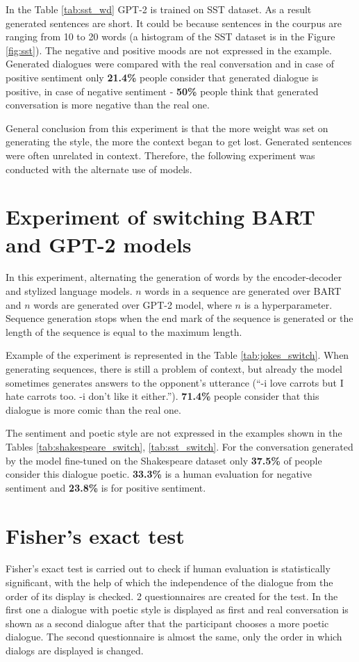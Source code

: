 In the Table \ref{tab:sst_wd} GPT-2 is trained on SST dataset. As a result generated sentences are short. It could be because sentences in the courpus are ranging from 10 to 20 words (a histogram of the SST dataset is in the Figure \ref{fig:sst}). The negative and positive moods are not expressed in the example. Generated dialogues were compared with the real conversation and in case of positive sentiment only \textbf{21.4\%} people consider that generated dialogue is positive, in case of negative sentiment - \textbf{50\%} people think that generated conversation is more negative than the real one. 

General conclusion from this experiment is that the more weight was set on generating the style, the more the context began to get lost. Generated sentences were often unrelated in context. Therefore, the following experiment was conducted with the alternate use of models.

\section{Experiment of switching BART and GPT-2 models}
In this experiment, alternating the generation of words by the encoder-decoder and stylized language models. $n$ words in a sequence are generated over BART and $n$ words are generated over GPT-2 model, where $n$ is a hyperparameter. Sequence generation stops when the end mark of the sequence is generated or the length of the sequence is equal to the maximum length.

Example of the experiment is represented in the Table \ref{tab:jokes_switch}. When generating sequences, there is still a problem of context, but already the model sometimes generates answers to the opponent's utterance (``-i love carrots but I hate carrots too. -i don't like it either.''). \textbf{71.4\%} people consider that this dialogue is more comic than the real one.

The sentiment and poetic style are not expressed in the examples shown in the Tables \ref{tab:shakespeare_switch}, \ref{tab:sst_switch}. For the conversation generated by the model fine-tuned on the Shakespeare dataset only \textbf{37.5\%} of people consider this dialogue poetic. \textbf{33.3\%} is a human evaluation for negative sentiment and \textbf{23.8\%} is for positive sentiment.

\section{Fisher's exact test}
Fisher's exact test is carried out to check if human evaluation is statistically significant, with the help of which the independence of the dialogue from the order of its display is checked. 2 questionnaires are created for the test. In the first one a dialogue with poetic style is displayed as first and real conversation is shown as a second dialogue after that the participant chooses a more poetic dialogue. The second questionnaire is almost the same, only the order in which dialogs are displayed is changed.

